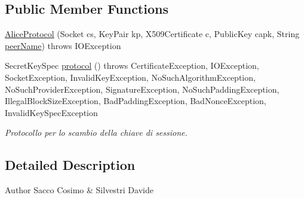 \subsection*{\-Public \-Member \-Functions}
\begin{DoxyCompactItemize}
\item 
\hyperlink{classit_1_1saccosilvestri_1_1jsp2p_1_1protocol_1_1_alice_protocol_a544a579caa70d9ed601c5f557fb206e7}{\-Alice\-Protocol} (\-Socket cs, \-Key\-Pair kp, \-X509\-Certificate c, \-Public\-Key capk, \-String \hyperlink{classit_1_1saccosilvestri_1_1jsp2p_1_1protocol_1_1_protocol_a6dcf1366f63023a80091ab663ecd3060}{peer\-Name})  throws I\-O\-Exception 
\item 
\-Secret\-Key\-Spec \hyperlink{classit_1_1saccosilvestri_1_1jsp2p_1_1protocol_1_1_alice_protocol_a60cbfe1906bfbd7b95a7d21cec977843}{protocol} ()  throws Certificate\-Exception, I\-O\-Exception, 			\-Socket\-Exception, Invalid\-Key\-Exception, No\-Such\-Algorithm\-Exception, 			\-No\-Such\-Provider\-Exception, Signature\-Exception, 			\-No\-Such\-Padding\-Exception, Illegal\-Block\-Size\-Exception, 			\-Bad\-Padding\-Exception, Bad\-Nonce\-Exception, Invalid\-Key\-Spec\-Exception 
\begin{DoxyCompactList}\small\item\em \-Protocollo per lo scambio della chiave di sessione. \end{DoxyCompactList}\end{DoxyCompactItemize}


\subsection{\-Detailed \-Description}
\begin{DoxyAuthor}{\-Author}
\-Sacco \-Cosimo \& \-Silvestri \-Davide 
\end{DoxyAuthor}


